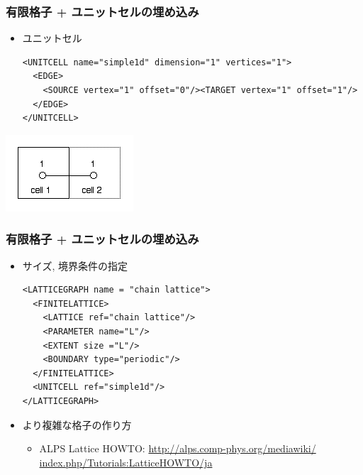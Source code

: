 \begin{frame}[t, fragile]
  \frametitle{有限格子 + ユニットセルの埋め込み}
  \begin{itemize}
  \item ユニットセル
  \begin{lstlisting}
<UNITCELL name="simple1d" dimension="1" vertices="1">
  <EDGE>
    <SOURCE vertex="1" offset="0"/><TARGET vertex="1" offset="1"/>
  </EDGE>
</UNITCELL>
\end{lstlisting}
  \end{itemize}
  \begin{center}
    \includegraphics[height=0.25\textheight]{TutorialLatticeHOWTOLatticegraph3}
  \end{center}
\end{frame}

\begin{frame}[t,fragile]
  \frametitle{有限格子 + ユニットセルの埋め込み}
  \begin{itemize}
  \item サイズ, 境界条件の指定
    \begin{lstlisting}
<LATTICEGRAPH name = "chain lattice">
  <FINITELATTICE>
    <LATTICE ref="chain lattice"/>
    <PARAMETER name="L"/>
    <EXTENT size ="L"/>
    <BOUNDARY type="periodic"/>
  </FINITELATTICE>
  <UNITCELL ref="simple1d"/>
</LATTICEGRAPH>
\end{lstlisting}
  \item より複雑な格子の作り方
    \begin{itemize}
    \item ALPS Lattice HOWTO: {\small \href{http://alps.comp-phys.org/mediawiki/index.php/Tutorials:LatticeHOWTO/ja}{http://alps.comp-phys.org/mediawiki/ index.php/Tutorials:LatticeHOWTO/ja}}
    \end{itemize}
  \end{itemize}
\end{frame}

